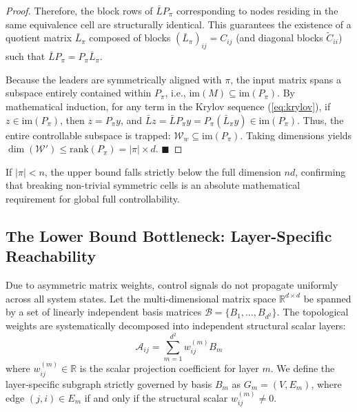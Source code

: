\documentclass{IEEEtran}
\begin{document}
\begin{proof}
		Therefore, the block rows of $\bar{L} P_\pi$ corresponding to nodes residing in the same equivalence cell are structurally identical. This guarantees the existence of a quotient matrix $\bar{L}_\pi$ composed of blocks $(\bar{L}_\pi)_{ij} = C_{ij}$ (and diagonal blocks $\tilde{C}_{ii}$) such that $\bar{L} P_\pi = P_\pi \bar{L}_\pi$. 
		
		Because the leaders are symmetrically aligned with $\pi$, the input matrix spans a subspace entirely contained within $P_\pi$, i.e., $\text{im}(M) \subseteq \text{im}(P_\pi)$. By mathematical induction, for any term in the Krylov sequence (\ref{eq:krylov}), if $z \in \text{im}(P_\pi)$, then $z = P_\pi y$, and $\bar{L} z = \bar{L} P_\pi y = P_\pi (\bar{L}_\pi y) \in \text{im}(P_\pi)$. Thus, the entire controllable subspace is trapped: $\mathcal{W}_w \subseteq \text{im}(P_\pi)$. Taking dimensions yields $\dim(\mathcal{W}') \le \text{rank}(P_\pi) = |\pi| \times d$. \hfill $\blacksquare$
	\end{proof}
	
	If $|\pi| < n$, the upper bound falls strictly below the full dimension $nd$, confirming that breaking non-trivial symmetric cells is an absolute mathematical requirement for global full controllability.
	
	\subsection{The Lower Bound Bottleneck: Layer-Specific Reachability}
	Due to asymmetric matrix weights, control signals do not propagate uniformly across all system states. Let the multi-dimensional matrix space $\mathbb{R}^{d \times d}$ be spanned by a set of linearly independent basis matrices $\mathcal{B} = \{B_1, \dots, B_{d^2}\}$. The topological weights are systematically decomposed into independent structural scalar layers:
	\begin{equation}
		\mathcal{A}_{ij} = \sum_{m=1}^{d^2} w_{ij}^{(m)} B_m
	\end{equation}
	where $w_{ij}^{(m)} \in \mathbb{R}$ is the scalar projection coefficient for layer $m$. We define the layer-specific subgraph strictly governed by basis $B_m$ as $G_m = (V, E_m)$, where edge $(j,i) \in E_m$ if and only if the structural scalar $w_{ij}^{(m)} \neq 0$.
	
\end{document}

